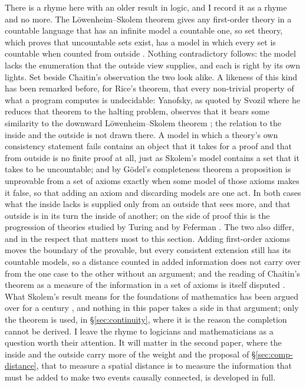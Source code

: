 There is a rhyme here with an older result in logic, and I record it as a rhyme and no more. The
L\"owenheim--Skolem theorem gives any first-order theory in a countable language that has an
infinite model a countable one, so set theory, which proves that uncountable sets exist, has a
model in which every set is countable when counted from outside
\autocite{skolem1922remarks}. Nothing contradictory follows: the model lacks the enumeration that
the outside view supplies, and each is right by its own lights. Set beside Chaitin's observation
the two look alike. A likeness of this kind has been remarked before, for Rice's theorem, that every non-trivial
property of what a program computes is undecidable: Yanofsky, as quoted by Svozil where he reduces
that theorem to the halting problem, observes that it bears some similarity to the downward
L\"owenheim--Skolem theorem \autocite[174--175]{svozil_k_2018}; the relation to the inside and the
outside is not drawn there. A model in which a theory's own consistency statement fails contains an object
that it takes for a proof and that from outside is no finite proof at all, just as Skolem's model
contains a set that it takes to be uncountable; and by G\"odel's completeness theorem a
proposition is unprovable from a set of axioms exactly when some model of those axioms makes it
false, so that adding an axiom and discarding models are one act. In both cases what the inside
lacks is supplied only from an outside that sees more, and that outside is in its turn the inside
of another; on the side of proof this is the progression of theories studied by Turing and by
Feferman \autocite{turing1939systems,feferman1962transfinite}. The two also differ, and in the
respect that matters most to this section. Adding first-order axioms moves the boundary of the
provable, but every consistent extension still has its countable models, so a distance counted in
added information does not carry over from the one case to the other without an argument; and the
reading of Chaitin's theorem as a measure of the information in a set of axioms is itself disputed
\autocite{raatikainen1998interpreting}. What Skolem's result means for the foundations of
mathematics has been argued over for a century \autocite{bays2025skolem}, and nothing in this
paper takes a side in that argument; only the theorem is used, in \S\ref{sec:continuity}, where it
is the reason the completion cannot be derived. I leave the rhyme to logicians and mathematicians
as a question worth their attention. It will matter in the second paper, where the inside and the
outside carry more of the weight and the proposal of \S\ref{sec:comp-distance}, that to measure a
spatial distance is to measure the information that must be added to make two events causally
connected, is developed in full.

